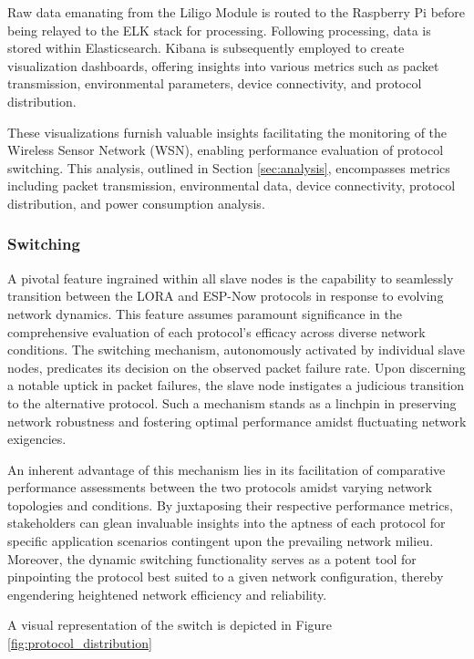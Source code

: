 Raw data emanating from the Liligo Module is routed to the Raspberry Pi before being relayed to the ELK stack for processing. Following processing, data is stored within Elasticsearch. Kibana is subsequently employed to create visualization dashboards, offering insights into various metrics such as packet transmission, environmental parameters, device connectivity, and protocol distribution.

These visualizations furnish valuable insights facilitating the monitoring of the Wireless Sensor Network (WSN), enabling performance evaluation of protocol switching. This analysis, outlined in Section \ref{sec:analysis}, encompasses metrics including packet transmission, environmental data, device connectivity, protocol distribution, and power consumption analysis.

\subsubsection{Switching}\label{sec:switching}

A pivotal feature ingrained within all slave nodes is the capability to seamlessly transition between the LORA and ESP-Now protocols in response to evolving network dynamics. This feature assumes paramount significance in the comprehensive evaluation of each protocol's efficacy across diverse network conditions. The switching mechanism, autonomously activated by individual slave nodes, predicates its decision on the observed packet failure rate. Upon discerning a notable uptick in packet failures, the slave node instigates a judicious transition to the alternative protocol. Such a mechanism stands as a linchpin in preserving network robustness and fostering optimal performance amidst fluctuating network exigencies.

An inherent advantage of this mechanism lies in its facilitation of comparative performance assessments between the two protocols amidst varying network topologies and conditions. By juxtaposing their respective performance metrics, stakeholders can glean invaluable insights into the aptness of each protocol for specific application scenarios contingent upon the prevailing network milieu. Moreover, the dynamic switching functionality serves as a potent tool for pinpointing the protocol best suited to a given network configuration, thereby engendering heightened network efficiency and reliability.

A visual representation of the switch is depicted in Figure \ref{fig:protocol_distribution}




